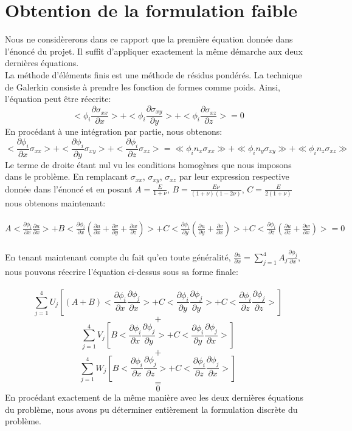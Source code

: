 \documentclass[12pt]{report}
\begin{document}
\section*{Obtention de la formulation faible}
Nous ne considèrerons dans ce rapport que la première équation donnée dans l'énoncé du projet. Il suffit d'appliquer exactement la même démarche aux deux dernières équations.\\ La méthode d'éléments finis est une méthode de résidus pondérés. La technique de Galerkin consiste à prendre les fonction de formes comme poids. Ainsi, l'équation peut être réecrite: $$ <\phi_{i} \frac{\partial{\sigma_{xx}}}{\partial{x}}> + <\phi_{i} \frac{\partial{\sigma_{xy}}}{\partial{y}}> + <\phi_{i} \frac{\partial{\sigma_{xz}}}{\partial{z}}>     = 0$$ En procédant à une intégration par partie, nous obtenons: $$ <\frac{\partial{\phi_{i}}}{\partial{x}} \sigma_{xx}> + <\frac{\partial{\phi_{i}}}{\partial{y}} \sigma_{xy}> + <\frac{\partial{\phi_{i}}}{\partial{z}} \sigma_{xz}> =  \ll \phi_{i}n_{x}\sigma_{xx} \gg +  \ll \phi_{i}n_{y}\sigma_{xy} \gg +  \ll \phi_{i}n_{z}\sigma_{xz} \gg $$ Le terme de droite étant nul vu les conditions homogènes que nous imposons  dans le problème. En remplacant $\sigma_{xx}$, $\sigma_{xy}$, $\sigma_{xz}$ par leur expression respective donnée dans l'énoncé et en posant $A = \frac{E}{1+\nu}$, $B = \frac{E\nu}{(1+\nu)(1-2\nu)}$, $C = \frac{E}{2(1+\nu)}$ nous obtenons maintenant:\\\\ $A<\frac{\partial{\phi_{i}}}{\partial{x}} \frac{\partial{u}}{\partial{x}}> + B<\frac{\partial{\phi_{i}}}{\partial{x}}\left(\frac{\partial{u}}{\partial{x}}+\frac{\partial{v}}{\partial{y}}+\frac{\partial{w}}{\partial{z}}\right)> + C<\frac{\partial{\phi_{i}}}{\partial{y}} \left(\frac{\partial{u}}{\partial{y}}+\frac{\partial{v}}{\partial{x}}\right)> + C<\frac{\partial{\phi_{i}}}{\partial{z}} \left(\frac{\partial{u}}{\partial{z}} + \frac{\partial{w}}{\partial{x}}\right)> = 0$\\\\
En tenant maintenant compte du fait qu'en toute généralité, $\frac{\partial{a}}{\partial{x}} = \sum_{j=1}^{4}A_{j}\frac{\partial{\phi_{j}}}{\partial{x}}$, nous pouvons réecrire l'équation ci-dessus sous sa forme finale:\\\\
$$\sum_{j=1}^{4}U_{j}\left[\left(A+B\right)<\frac{\partial{\phi_{i}}}{\partial{x}}\frac{\partial{\phi_{j}}}{\partial{x}}>+C<\frac{\partial{\phi_{i}}}{\partial{y}}\frac{\partial{\phi_{j}}}{\partial{y}}>+C<\frac{\partial{\phi_{i}}}{\partial{z}}\frac{\partial{\phi_{j}}}{\partial{z}}>\right]$$ $$+$$ $$\sum_{j=1}^{4} V_{j}\left[B<\frac{\partial{\phi_{i}}}{\partial{x}}\frac{\partial{\phi_{j}}}{\partial{y}}>+C<\frac{\partial{\phi_{i}}}{\partial{y}}\frac{\partial{\phi_{j}}}{\partial{x}}>\right]$$ $$+$$ $$\sum_{j=1}^{4}W_{j}\left[B<\frac{\partial{\phi_{i}}}{\partial{x}}\frac{\partial{\phi_{j}}}{\partial{z}}>+C<\frac{\partial{\phi_{i}}}{\partial{z}}\frac{\partial{\phi_{j}}}{\partial{x}}>\right]$$ $$=$$ $$0$$
En procédant exactement de la même manière avec les deux dernières équations du problème, nous avons pu déterminer entièrement la formulation discrète du problème.
\end{document}
